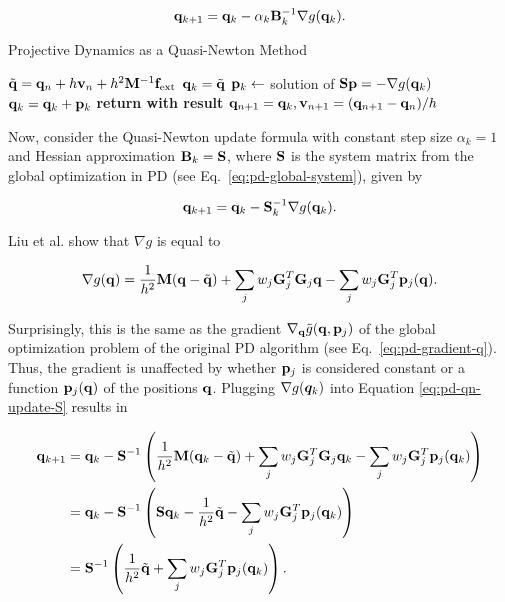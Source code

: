 \begin{equation}\label{eq:pd-qn-update}
    \mathbf{q}_{k+1} = \mathbf{q}_k - \alpha_k \mathbf{B}^{-1}_k \nabla g(\mathbf{q}_k).
\end{equation}

\begin{algorithm}[b]
\caption{Projective Dynamics as a Quasi-Newton Method}\label{alg:pd-qn}
\begin{algorithmic}
\State $\tilde{\mathbf{q}} = \mathbf{q}_n + h\mathbf{v}_n + h^2\mathbf{M}^{-1}\mathbf{f}_{\text{ext}}$
\State $\mathbf{q}_k = \tilde{\mathbf{q}}$
\State $\mathbf{p}_k \gets$ solution of $\mathbf{S}\mathbf{p} = -\nabla g(\mathbf{q}_k)$
\State $\mathbf{q}_k = \mathbf{q}_k + \mathbf{p}_k$
\EndFor
\State \textbf{return with result } $\mathbf{q}_{n+1} = \mathbf{q}_k, \mathbf{v}_{n+1} = (\mathbf{q}_{n+1} - \mathbf{q}_n)/h$
\EndProcedure
\end{algorithmic}
\end{algorithm}

Now, consider the Quasi-Newton update formula with constant step size $\alpha_k = 1$ and Hessian approximation $\mathbf{B}_k = \mathbf{S}$, where $\mathbf{S}$
is the system matrix from the global optimization in PD (see Eq.\ \ref{eq:pd-global-system}), given by

\begin{equation}\label{eq:pd-qn-update-S}
    \mathbf{q}_{k+1} = \mathbf{q}_k - \mathbf{S}^{-1}_k \nabla g(\mathbf{q}_k).
\end{equation}

\noindent Liu et al. \cite{liu2017} show that $\nabla g$ is equal to

\begin{equation}\label{eq:pd-gradient-qn}
    \nabla g(\mathbf{q}) = \frac{1}{h^2}\mathbf{M}(\mathbf{q} - \tilde{\mathbf{q}}) + \sum_j w_j \mathbf{G}^T_j \mathbf{G}_j \mathbf{q}
    - \sum_j w_j \mathbf{G}^T_j \mathbf{p}_j(\mathbf{q}).
\end{equation}

\noindent Surprisingly, this is the same as the gradient $\nabla_{\mathbf{q}} \tilde{g}(\mathbf{q}, \mathbf{p}_j)$ of the global optimization problem of the original
PD algorithm (see Eq.\ \ref{eq:pd-gradient-q}). Thus, the gradient is unaffected by whether $\mathbf{p}_j$ is considered constant or a function
$\mathbf{p}_j(\mathbf{q})$ of the positions $\mathbf{q}$. Plugging $\nabla g(\bm{q}_k)$ into Equation \ref{eq:pd-qn-update-S} results in 

\begin{align*}
    \mathbf{q}_{k+1} &= \mathbf{q}_k - \mathbf{S}^{-1}\left(\frac{1}{h^2}\mathbf{M}(\mathbf{q}_k - \tilde{\mathbf{q}}) + \sum_j w_j \mathbf{G}^T_j \mathbf{G}_j \mathbf{q}_k
    - \sum_j w_j \mathbf{G}^T_j \mathbf{p}_j(\mathbf{q}_k)\right)\\
                   &= \mathbf{q}_k - \mathbf{S}^{-1}\left(\mathbf{S}\mathbf{q}_k - \frac{1}{h^2}\tilde{\mathbf{q}} - \sum_j w_j \mathbf{G}^T_j \mathbf{p}_j(\mathbf{q}_k)\right)\\
                   &= \mathbf{S}^{-1}\left(\frac{1}{h^2}\tilde{\mathbf{q}} + \sum_j w_j \mathbf{G}^T_j \mathbf{p}_j(\mathbf{q}_k)\right).
\end{align*}


